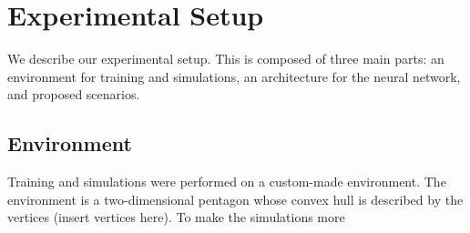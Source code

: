 \documentclass[10pt,conference]{IEEEtran}
\begin{document}
	\section{Experimental Setup}
	We describe our experimental setup. This is composed of three main parts: an environment for training and simulations, an architecture for the neural network, and proposed scenarios. 
	\subsection{Environment}
		Training and simulations were performed on a custom-made environment. The environment is a two-dimensional pentagon whose convex hull is described by the vertices (insert vertices here). To make the simulations more 
\nocite{*}


\end{document}
